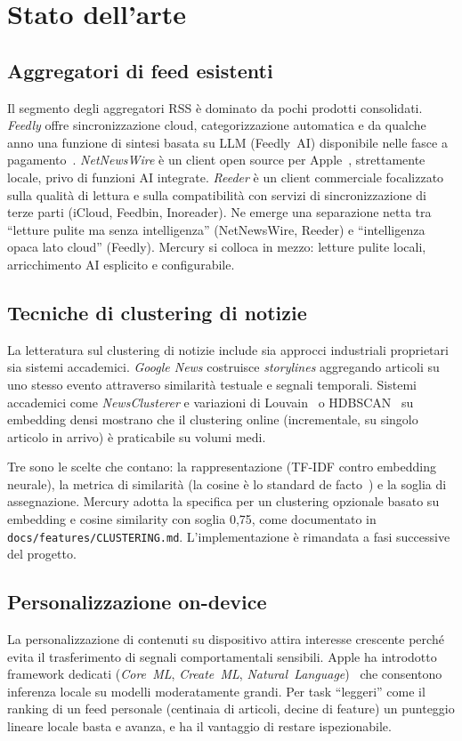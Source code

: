 \chapter{Stato dell'arte}
\label{cap:stato-arte}

\section{Aggregatori di feed esistenti}
Il segmento degli aggregatori RSS è dominato da pochi prodotti consolidati.
\emph{Feedly} offre sincronizzazione cloud, categorizzazione automatica e da
qualche anno una funzione di sintesi basata su LLM (Feedly~AI) disponibile
nelle fasce a pagamento~\cite{feedly}. \emph{NetNewsWire} è un client open
source per Apple~\cite{netnewswire}, strettamente locale, privo di funzioni AI
integrate. \emph{Reeder} è un client
commerciale focalizzato sulla qualità di lettura e sulla compatibilità con
servizi di sincronizzazione di terze parti (iCloud, Feedbin, Inoreader). Ne
emerge una separazione netta tra ``letture pulite ma senza intelligenza''
(NetNewsWire, Reeder) e ``intelligenza opaca lato cloud'' (Feedly). Mercury si
colloca in mezzo: letture pulite locali, arricchimento AI esplicito e
configurabile.

\section{Tecniche di clustering di notizie}
La letteratura sul clustering di notizie include sia approcci industriali
proprietari sia sistemi accademici. \emph{Google News} costruisce
\emph{storylines} aggregando articoli su uno stesso evento attraverso
similarità testuale e segnali temporali. Sistemi accademici come
\emph{NewsClusterer} e variazioni di Louvain~\cite{blondel2008louvain} o
HDBSCAN~\cite{campello2013hdbscan} su embedding densi
mostrano che il clustering online (incrementale, su singolo articolo in arrivo)
è praticabile su volumi medi.

Tre sono le scelte che contano: la rappresentazione (TF-IDF contro embedding
neurale), la metrica di similarità (la cosine è lo standard de facto~\cite{manning2008ir})
e la soglia di assegnazione. Mercury adotta la specifica per un clustering
opzionale basato su embedding e cosine similarity con soglia 0,75, come
documentato in \texttt{docs/features/CLUSTERING.md}. L'implementazione è
rimandata a fasi successive del progetto.

\section{Personalizzazione on-device}
La personalizzazione di contenuti su dispositivo attira interesse crescente
perché evita il trasferimento di segnali comportamentali sensibili.
Apple ha introdotto framework dedicati (\emph{Core~ML}, \emph{Create~ML},
\emph{Natural~Language})~\cite{apple-coreml} che consentono inferenza locale su
modelli moderatamente grandi. Per task ``leggeri'' come il ranking di un feed personale
(centinaia di articoli, decine di feature) un punteggio lineare locale basta e
avanza, e ha il vantaggio di restare ispezionabile.

